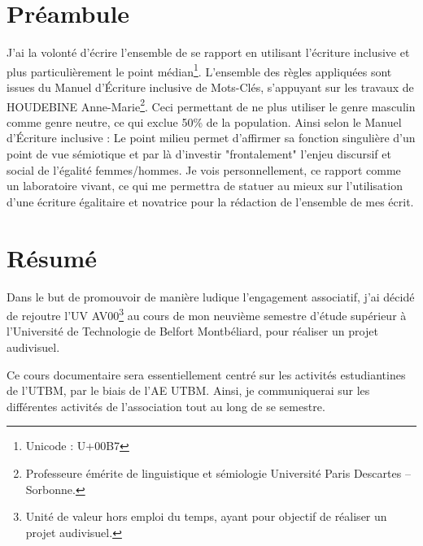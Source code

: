\documentclass{librairies/lib}
\begin{document}



\newpage
\pagestyle{no_number}

\section*{Préambule}

J'ai la volonté d'écrire l'ensemble de se rapport en utilisant l'écriture inclusive et plus particulièrement le point médian\footnote{Unicode : U+00B7}.
L'ensemble des règles appliquées sont issues du Manuel d’Écriture inclusive\cite{MEI} de Mots-Clés, s'appuyant sur les travaux de HOUDEBINE Anne-Marie\footnote{Professeure émérite de linguistique et sémiologie Université Paris Descartes – Sorbonne.}.
Ceci permettant de ne plus utiliser le genre masculin comme genre neutre, ce qui exclue 50\% de la population.
Ainsi selon le Manuel d’Écriture inclusive : \og Le point milieu permet d'affirmer sa fonction singulière d'un point de vue sémiotique et par là d'investir "frontalement" l'enjeu discursif et social de l'égalité femmes/hommes. \fg{}
Je vois personnellement, ce rapport comme un laboratoire vivant, ce qui me permettra de statuer au mieux sur l'utilisation d'une écriture égalitaire et novatrice pour la rédaction de l'ensemble de mes écrit.


\newpage


\section*{Résumé}

Dans le but de promouvoir de manière ludique l'engagement associatif, j'ai décidé de rejoutre l'UV AV00\footnote{Unité de valeur hors emploi du temps, ayant pour objectif de réaliser un projet audivisuel.} au cours de mon neuvième semestre d'étude supérieur à l'Université de Technologie de Belfort Montbéliard, pour réaliser un projet audivisuel.

Ce cours documentaire sera essentiellement centré sur les activités estudiantines de l'\gls{UTBM}, par le biais de l'\gls{AE} \gls{UTBM}.
Ainsi, je communiquerai sur les différentes activités de l'association tout au long de se semestre.

\newpage
\end{document}
